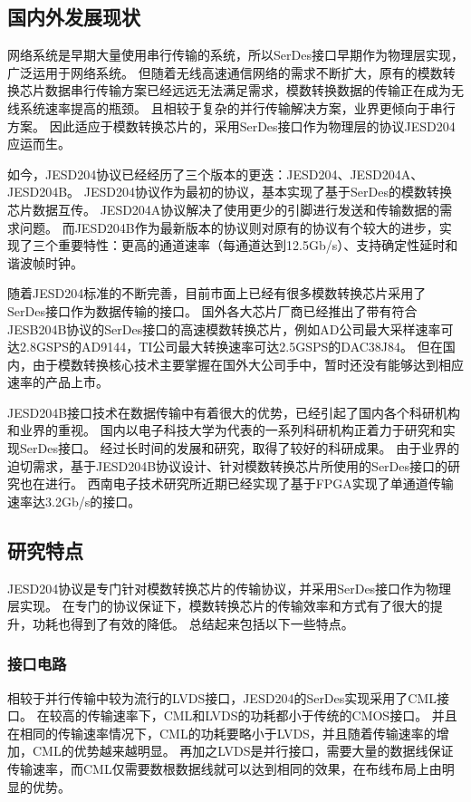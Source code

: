 \documentclass[UTF8]{ctexart}
\begin{document}
\subsection{国内外发展现状}

网络系统是早期大量使用串行传输的系统，所以SerDes接口早期作为物理层实现，广泛运用于网络系统。
但随着无线高速通信网络的需求不断扩大，原有的模数转换芯片数据串行传输方案已经远远无法满足需求，模数转换数据的传输正在成为无线系统速率提高的瓶颈。
且相较于复杂的并行传输解决方案，业界更倾向于串行方案。
因此适应于模数转换芯片的，采用SerDes接口作为物理层的协议JESD204应运而生。

如今，JESD204协议已经经历了三个版本的更迭：JESD204、JESD204A、JESD204B。
JESD204协议作为最初的协议，基本实现了基于SerDes的模数转换芯片数据互传。
JESD204A协议解决了使用更少的引脚进行发送和传输数据的需求问题。
而JESD204B作为最新版本的协议则对原有的协议有个较大的进步，实现了三个重要特性：更高的通道速率（每通道达到12.5Gb/s）、支持确定性延时和谐波帧时钟。\cite{Beavers2014}

随着JESD204标准的不断完善，目前市面上已经有很多模数转换芯片采用了SerDes接口作为数据传输的接口。
国外各大芯片厂商已经推出了带有符合JESB204B协议的SerDes接口的高速模数转换芯片，例如AD公司最大采样速率可达2.8GSPS的AD9144\cite{ad9144AD}，TI公司最大转换速率可达2.5GSPS的DAC38J84\cite{DAC38J84TI}。
但在国内，由于模数转换核心技术主要掌握在国外大公司手中，暂时还没有能够达到相应速率的产品上市。

JESD204B接口技术在数据传输中有着很大的优势，已经引起了国内各个科研机构和业界的重视。
国内以电子科技大学为代表的一系列科研机构正着力于研究和实现SerDes接口。
经过长时间的发展和研究，取得了较好的科研成果。
由于业界的迫切需求，基于JESD204B协议设计、针对模数转换芯片所使用的SerDes接口的研究也在进行。
西南电子技术研究所近期已经实现了基于FPGA实现了单通道传输速率达3.2Gb/s的接口\cite{zhangf2014}。

\subsection{研究特点}

JESD204协议是专门针对模数转换芯片的传输协议，并采用SerDes接口作为物理层实现。
在专门的协议保证下，模数转换芯片的传输效率和方式有了很大的提升，功耗也得到了有效的降低。
总结起来包括以下一些特点。

\subsubsection{接口电路}

相较于并行传输中较为流行的LVDS接口，JESD204的SerDes实现采用了CML接口。
在较高的传输速率下，CML和LVDS的功耗都小于传统的CMOS接口。
并且在相同的传输速率情况下，CML的功耗要略小于LVDS，并且随着传输速率的增加，CML的优势越来越明显。
再加之LVDS是并行接口，需要大量的数据线保证传输速率，而CML仅需要数根数据线就可以达到相同的效果，在布线布局上由明显的优势。
\end{document}
